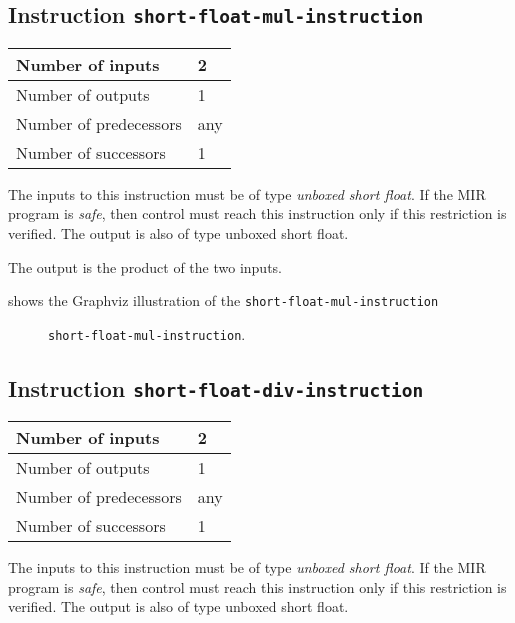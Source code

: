 \subsection{Instruction \texttt{short-float-mul-instruction}}
\label{mir-instruction-short-float-mul}

\begin{tabular}{|l|l|}
\hline
Number of inputs & 2\\
\hline
Number of outputs & 1\\
\hline
Number of predecessors & any\\
\hline
Number of successors & 1\\
\hline
\end{tabular}

The inputs to this instruction must be of type \emph{unboxed short
  float}.  If the MIR program is \emph{safe}, then control must reach
this instruction only if this restriction is verified.  The output is
also of type unboxed short float.

The output is the product of the two inputs.

 shows the Graphviz illustration of the
\texttt{short-float-mul-instruction}

\begin{figure}
\begin{center}
\end{center}
\caption{\label{fig-short-float-mul-instruction}
\texttt{short-float-mul-instruction}.}
\end{figure}

\subsection{Instruction \texttt{short-float-div-instruction}}
\label{mir-instruction-short-float-div}

\begin{tabular}{|l|l|}
\hline
Number of inputs & 2\\
\hline
Number of outputs & 1\\
\hline
Number of predecessors & any\\
\hline
Number of successors & 1\\
\hline
\end{tabular}

The inputs to this instruction must be of type \emph{unboxed short
  float}.  If the MIR program is \emph{safe}, then control must reach
this instruction only if this restriction is verified.  The output is
also of type unboxed short float.

